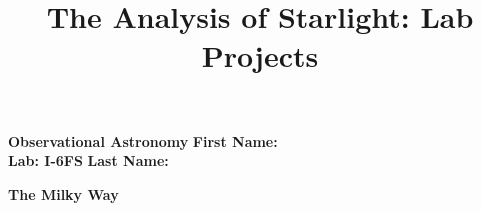 \documentclass[12pt]{article}
\title{The Analysis of Starlight: Lab Projects}
\begin{document}
\setcounter{page}{1}
\setcounter{equation}{0}
\pagestyle{plain}
\thispagestyle{empty}  %
\newcommand{\kms}{\hbox{km\,s$^{\rm -1}$}}
\def\lo {\ifmmode {\,{\it L}\solar} \else $\,L$\solar\fi}       %
\def\my {\ifmmode {\,{\it M}\solar\,{\rm yr^{-1}}}              %
        \else {$\,M$\solar$\,$yr$^{\rm -1}$}\fi}
\def\BD {BD$\,$+30{\degr}3639}
\def\HUNO{\rm H$\,$I}                   %
\def\HDOS{\rm H$_2$}                    %
\def\arcsec{\ifmmode {^{\scriptscriptstyle\prime\prime}}
          \else $^{\scriptscriptstyle\prime\prime}$\fi}
\def\arcmin{\ifmmode {^{\scriptscriptstyle\prime}}
          \else $^{\scriptscriptstyle\prime}$\fi}
\def\deg{\ifmmode^\circ\else$^\circ$\fi}



\noindent
{\bf Observational Astronomy    \hfill} {\bf First Name:\makebox[4cm]{\hrulefill}}\\
{\bf Lab: I-6FS} \hfill {\bf Last Name:\makebox[4cm]{\hrulefill}}


\bigskip

\medskip

\noindent
{\hfill \Large {\bf The Milky Way} \hfill}

\bigskip


\end{document}
